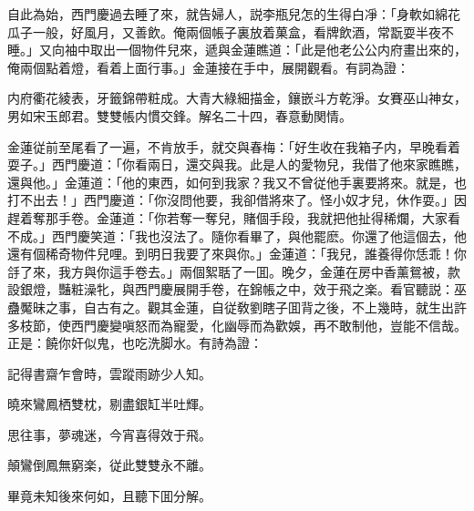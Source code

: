 自此為始，西門慶過去睡了來，就告婦人，説李瓶兒怎的生得白凈：「身軟如綿花瓜子一般，好風月，又善飲。俺兩個帳子裏放着菓盒，看牌飲酒，常翫耍半夜不睡。」又向袖中取出一個物件兒來，遞與金蓮瞧道：「此是他老公公内府畫出來的，俺兩個點着燈，看着上面行事。」金蓮接在手中，展開觀看。有詞為證：

\begin{myquote}
内府衢花綾表，牙籤錦帶粧成。大青大綠細描金，鑲嵌斗方乾淨。女賽巫山神女，男如宋玉郎君。雙雙帳内慣交鋒。解名二十四，春意動関情。
\end{myquote}

金蓮従前至尾看了一遍，不肯放手，就交與春梅：「好生收在我箱子内，早晚看着耍子。」西門慶道：「你看兩日，還交與我。此是人的愛物兒，我借了他來家瞧瞧，還與他。」金蓮道：「他的東西，如何到我家？我又不曾従他手裏要將來。就是，也打不出去！」西門慶道：「你沒問他要，我卻借將來了。怪小奴才兒，休作耍。」因趕着奪那手卷。金蓮道：「你若奪一奪兒，賭個手段，我就把他扯得稀爛，大家看不成。」西門慶笑道：「我也沒法了。隨你看畢了，與他罷麽。你還了他這個去，他還有個稀奇物件兒哩。到明日我要了來與你。」金蓮道：「我兒，誰養得你恁乖！你㧱了來，我方與你這手卷去。」兩個絮聒了一囬。晚夕，金蓮在房中香薰鴛被，款設銀燈，豔粧澡牝，與西門慶展開手卷，在錦帳之中，效于飛之楽。看官聽説：巫蠱魘昧之事，自古有之。觀其金蓮，自従敎劉瞎子囬背之後，不上幾時，就生出許多枝節，使西門慶變嗔怒而為寵愛，化幽辱而為歡娛，再不敢制他，豈能不信哉。正是：饒你奸似鬼，也吃洗脚水。有詩為證：

\begin{myquote}
記得書齋乍會時，雲蹤雨跡少人知。

曉來鸞鳳栖雙枕，剔盡銀缸半吐輝。

思往事，夢魂迷，今宵喜得效于飛。

顛鸞倒鳳無窮楽，従此雙雙永不離。
\end{myquote}

畢竟未知後來何如，且聽下囬分解。

